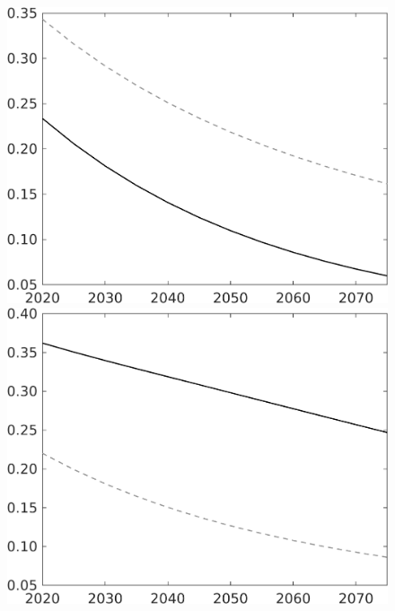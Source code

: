 \documentclass[12pt]{article}
\begin{document}
\begin{figure}
\begin{minipage}[]{0.32\textwidth}
	\end{minipage}
\begin{minipage}[]{0.32\textwidth}
	\includegraphics[width=1\textwidth]{../../codding_model/own_basedOnFried/optimalPol_010922_revision/figures/all_13Sept22/LevTaufNoTauf_TaulCalib_Equlab_regime0_sff_spillover0_nsk1_xgr0_knspil1_sep1_LFlimit0_emsbase0_countec0_GovRev0_etaa0.79_lgd0.png}
\end{minipage}
\begin{minipage}[]{0.32\textwidth}
	\includegraphics[width=1\textwidth]{../../codding_model/own_basedOnFried/optimalPol_010922_revision/figures/all_13Sept22/LevTaufNoTauf_TaulCalib_Equlab_regime0_sg_spillover0_nsk1_xgr0_knspil1_sep1_LFlimit0_emsbase0_countec0_GovRev0_etaa0.79_lgd0.png}

\end{minipage}
\end{figure}
\end{document}
